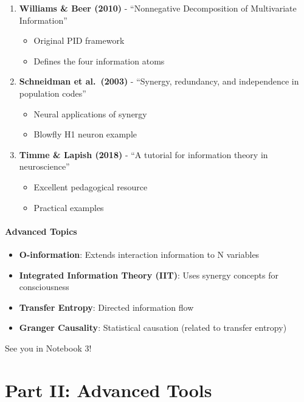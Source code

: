 \documentclass[
  11pt,
  letterpaper,
  oneside,
  openany]{book}
\providecommand{\tightlist}{%
  \setlength{\itemsep}{0pt}\setlength{\parskip}{0pt}}
\begin{document}
\begin{enumerate}
\def\labelenumi{\arabic{enumi}.}
\tightlist
\item
  \textbf{Williams \& Beer (2010)} - ``Nonnegative Decomposition of
  Multivariate Information''

  \begin{itemize}
  \tightlist
  \item
    Original PID framework
  \item
    Defines the four information atoms
  \end{itemize}
\item
  \textbf{Schneidman et al.~(2003)} - ``Synergy, redundancy, and
  independence in population codes''

  \begin{itemize}
  \tightlist
  \item
    Neural applications of synergy
  \item
    Blowfly H1 neuron example
  \end{itemize}
\item
  \textbf{Timme \& Lapish (2018)} - ``A tutorial for information theory
  in neuroscience''

  \begin{itemize}
  \tightlist
  \item
    Excellent pedagogical resource
  \item
    Practical examples
  \end{itemize}
\end{enumerate}

\subsection{Advanced Topics}\label{advanced-topics}

\begin{itemize}
\tightlist
\item
  \textbf{O-information}: Extends interaction information to N variables
\item
  \textbf{Integrated Information Theory (IIT)}: Uses synergy concepts
  for consciousness
\item
  \textbf{Transfer Entropy}: Directed information flow
\item
  \textbf{Granger Causality}: Statistical causation (related to transfer
  entropy)
\end{itemize}

See you in Notebook 3! 🚀

\part{Part II: Advanced Tools}
\end{document}
